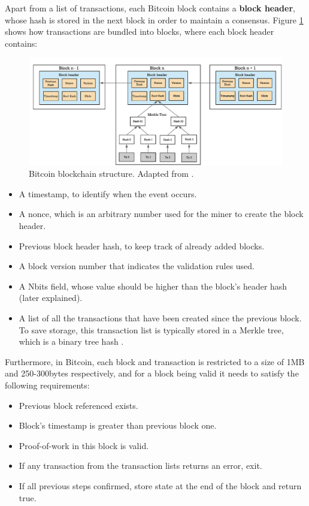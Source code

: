 Apart from a list of transactions, each Bitcoin block contains a \textbf{block header}, whose hash is stored in the next block in order to maintain a consensus. Figure \ref{fig:Bitcoin Blockchain mining} shows how transactions are bundled into blocks, where each block header contains:

\begin{figure}[t]
  	\includegraphics[width=1\linewidth]{gfx/mining}    
  	\caption{Bitcoin blockchain structure. Adapted from \citep{hans2017blockchain}.}
  	\label{fig:Bitcoin Blockchain mining}
\end{figure}

\begin{itemize}
	\item A timestamp, to identify when the event occurs.
	\item A nonce, which is an arbitrary number used for the miner to create the block header.
	\item Previous block header hash, to keep track of already added blocks.
	\item A block version number that indicates the validation rules used.
	\item A Nbits field, whose value should be higher than the block's header hash (later explained).
	\item A list of all the transactions that have been created since the previous block. To save storage, this transaction list is typically stored in a Merkle tree, which is a binary tree hash \citep{merkle1987digital}.

\end{itemize}

Furthermore, in Bitcoin, each block and transaction is restricted to a size of 1MB and 250-300bytes respectively, and for a block being valid it needs to satisfy the following requirements:

\begin{itemize}
	\item Previous block referenced exists.
	\item Block's timestamp is greater than previous block one.
	\item Proof-of-work in this block is valid.
	\item If any transaction from the transaction lists returns an error, exit.
	\item If all previous steps confirmed, store state at the end of the block and return true.
\end{itemize}  

